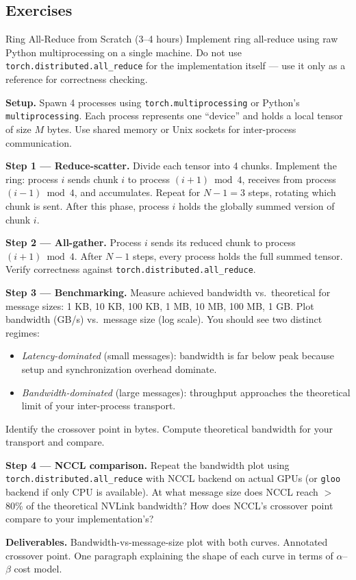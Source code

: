 \subsection*{Exercises}

\begin{exercise}{Ring All-Reduce from Scratch (3--4 hours)}
Implement ring all-reduce using raw Python multiprocessing on a single machine.
Do not use \texttt{torch.distributed.all\_reduce} for the implementation itself --- use it only as a
reference for correctness checking.

\medskip
\textbf{Setup.}
Spawn 4 processes using \texttt{torch.multiprocessing} or Python's \texttt{multiprocessing}.
Each process represents one ``device'' and holds a local tensor of size $M$ bytes.
Use shared memory or Unix sockets for inter-process communication.

\medskip
\textbf{Step 1 --- Reduce-scatter.}
Divide each tensor into 4 chunks.
Implement the ring: process $i$ sends chunk $i$ to process $(i+1) \bmod 4$,
receives from process $(i-1) \bmod 4$, and accumulates.
Repeat for $N-1 = 3$ steps, rotating which chunk is sent.
After this phase, process $i$ holds the globally summed version of chunk $i$.

\medskip
\textbf{Step 2 --- All-gather.}
Process $i$ sends its reduced chunk to process $(i+1) \bmod 4$.
After $N-1$ steps, every process holds the full summed tensor.
Verify correctness against \texttt{torch.distributed.all\_reduce}.

\medskip
\textbf{Step 3 --- Benchmarking.}
Measure achieved bandwidth vs.\ theoretical for message sizes:
1 KB, 10 KB, 100 KB, 1 MB, 10 MB, 100 MB, 1 GB.
Plot bandwidth (GB/s) vs.\ message size (log scale).
You should see two distinct regimes:
\begin{itemize}
  \item \emph{Latency-dominated} (small messages): bandwidth is far below peak because
        setup and synchronization overhead dominate.
  \item \emph{Bandwidth-dominated} (large messages): throughput approaches the
        theoretical limit of your inter-process transport.
\end{itemize}
Identify the crossover point in bytes.
Compute theoretical bandwidth for your transport and compare.

\medskip
\textbf{Step 4 --- NCCL comparison.}
Repeat the bandwidth plot using \texttt{torch.distributed.all\_reduce} with NCCL backend on actual
GPUs (or \texttt{gloo} backend if only CPU is available).
At what message size does NCCL reach $>$80\% of the theoretical NVLink bandwidth?
How does NCCL's crossover point compare to your implementation's?

\medskip
\textbf{Deliverables.} Bandwidth-vs-message-size plot with both curves.
Annotated crossover point.
One paragraph explaining the shape of each curve in terms of $\alpha$--$\beta$ cost model.
\end{exercise}

